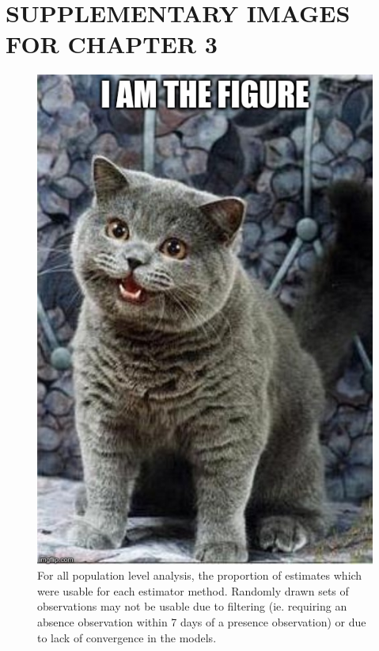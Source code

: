 \chapter{SUPPLEMENTARY IMAGES FOR CHAPTER 3}

\begin{figure}
	\centering
	\includegraphics[scale=0.3]{images/figure_filler.jpg}
	\caption[For all population level analysis, the proportion of estimates which were usable for each estimator method]{For all population level analysis, the proportion of estimates which were usable for each estimator method. Randomly drawn sets of observations may not be usable due to filtering (ie. requiring an absence observation within 7 days of a presence observation) or due to lack of convergence in the models.} \label{fig-b-1}
\end{figure}

